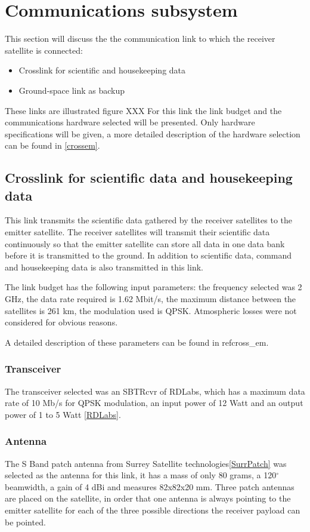 \section{Communications subsystem}
This section will discuss the  the communication link to which the receiver satellite is connected:
\begin{itemize}
\item Crosslink for scientific and housekeeping data
\item Ground-space link as backup
\end{itemize}

These links are illustrated figure XXX
For this link the link budget and the communications hardware selected will be presented. Only hardware specifications will be given, a more detailed description of the hardware selection can be found in \ref{crossem}.

\subsection{Crosslink for scientific data and housekeeping data}
This link transmits the scientific data gathered by the receiver satellites to the emitter satellite. The receiver satellites will transmit their scientific data continuously so that the emitter satellite can store all data in one data bank before it is transmitted to the ground. In addition to scientific data, command and housekeeping data is also transmitted in this link.

The link budget has the following input parameters: the frequency selected was 2 GHz, the data rate required is 1.62 Mbit/s, the maximum distance between the satellites is 261 km, the modulation used is QPSK. Atmospheric losses were not considered for obvious reasons.

A detailed description of these parameters can be found in ref{cross_em}.

\subsubsection{Transceiver}
The transceiver selected was an SBTRcvr of RDLabs, which has a maximum data rate of 10 Mb/s for QPSK modulation, an input power of 12 Watt and an output power of 1 to 5 Watt \ref{RDLabs}.

\subsubsection{Antenna}
The S Band patch antenna from Surrey Satellite technologies\ref{SurrPatch} was selected as the antenna for this link, it has a mass of only 80 grams, a 120$^{\circ}$ beamwidth, a gain of 4 dBi and measures 82x82x20 mm. Three patch antennas are placed on the satellite, in order that one antenna is always pointing to the emitter satellite for each of the three possible directions the receiver payload can be pointed.


